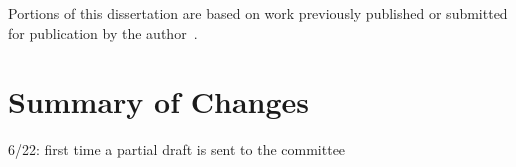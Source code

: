 

\ifperchapterbib%
\else\fi%
Portions of this dissertation are based on work previously published or submitted for publication by the author~\citep{asmuth09,asmuth11}.
%
\ifchangebars%
\section*{\protect{\cbstart}Summary of Changes}%
\begin{list}{}{\topsep 0pt%
               \baselineskip}%
\item 6/22: first time a partial draft is sent to the committee

\end{list}%
\cbend%
\else\fi%
